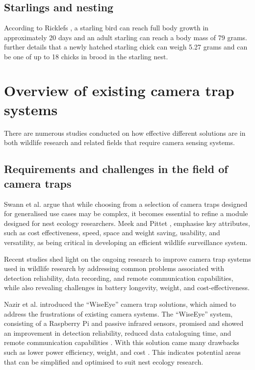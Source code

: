 \subsection{Starlings and nesting}

According to Ricklefs \cite{ricklefs1968patterns}, a starling bird can reach full body growth in approximately 20 days and an adult starling can reach a body mass of 79 grams. \cite{ricklefs1968patterns} further details that a newly hatched starling chick can weigh 5.27 grams and can be one of up to 18 chicks in brood in the starling nest. 



\section{Overview of existing camera trap systems}

There are numerous studies conducted on how effective different solutions are in both wildlife research and related fields that require camera sensing systems. 

\subsection{Requirements and challenges in the field of camera traps}

Swann et al. \cite{swann2011evaluating} argue that while choosing from a selection of camera traps designed for generalised use cases may be complex, it becomes essential to refine a module designed for nest ecology researchers. Meek and Pittet \cite{meek2012user}, emphasise key attributes, such as cost effectiveness, speed, space and weight saving, usability, and versatility, as being critical in developing an efficient wildlife surveillance system.  

Recent studies shed light on the ongoing research to improve camera trap systems used in wildlife research by addressing common problems associated with detection reliability, data recording, and remote communication capabilities, while also revealing challenges in battery longevity, weight, and cost-effectiveness. 

Nazir et al. \cite{nazir2017wiseeye} introduced the “WiseEye” camera trap solutions, which aimed to address the frustrations of existing camera systems. The “WiseEye” system, consisting of a Raspberry Pi and passive infrared sensors, promised and showed an improvement in detection reliability, reduced data cataloguing time, and remote communication capabilities \cite{nazir2017wiseeye}. With this solution came many drawbacks such as lower power efficiency, weight, and cost \cite{nazir2017wiseeye}. This indicates potential areas that can be simplified and optimised to suit nest ecology research.  

